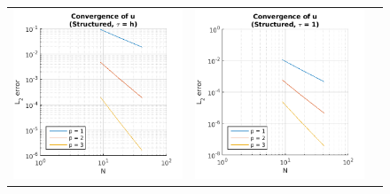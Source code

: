 \documentclass{article}
\begin{document}
\begin{figure}
\begin{tabular}{c c c}
\includegraphics[scale=0.5]{cs_1.png} & 
\includegraphics[scale=0.5]{cs_2.png} & 

\end{tabular}
\end{figure}
\end{document}
